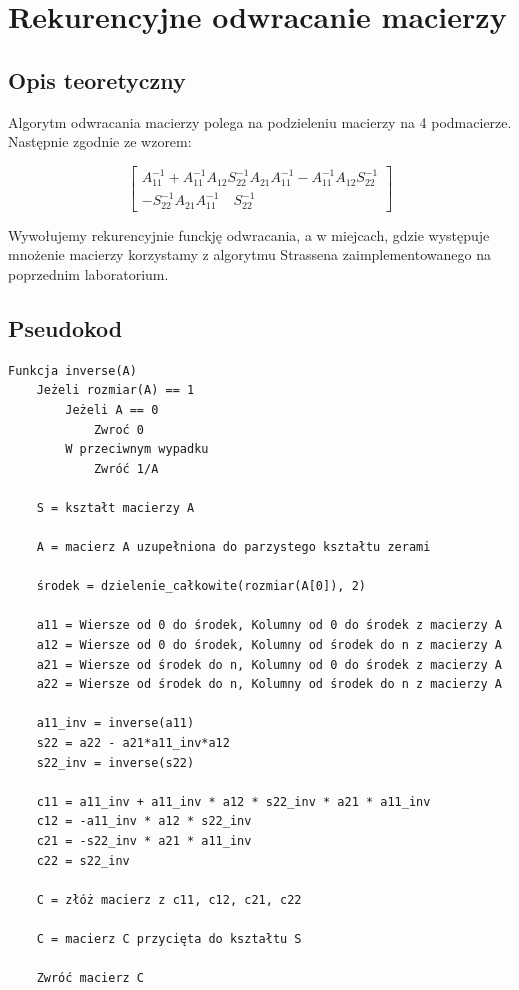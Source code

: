 \documentclass{article}
\begin{document}
\section{Rekurencyjne odwracanie macierzy}

\subsection{Opis teoretyczny}

Algorytm odwracania macierzy polega na podzieleniu macierzy na 4 podmacierze. Następnie zgodnie ze wzorem:

\[
\begin{bmatrix}
A_{11}^{-1} + A_{11}^{-1} A_{12} S_{22}^{-1} A_{21} A_{11}^{-1} - A_{11}^{-1} A_{12} S_{22}^{-1} \\
- S_{22}^{-1} A_{21} A_{11}^{-1} \quad S_{22}^{-1}
\end{bmatrix}
\]


\bigbreak

\noindent
Wywołujemy rekurencyjnie funckję odwracania, a w miejcach, gdzie występuje mnożenie macierzy korzystamy z algorytmu Strassena zaimplementowanego na poprzednim laboratorium.

\subsection{Pseudokod}

\begin{verbatim}
Funkcja inverse(A)
    Jeżeli rozmiar(A) == 1
        Jeżeli A == 0
            Zwroć 0
        W przeciwnym wypadku
            Zwróć 1/A

    S = kształt macierzy A

    A = macierz A uzupełniona do parzystego kształtu zerami

    środek = dzielenie_całkowite(rozmiar(A[0]), 2) 
    
    a11 = Wiersze od 0 do środek, Kolumny od 0 do środek z macierzy A
    a12 = Wiersze od 0 do środek, Kolumny od środek do n z macierzy A
    a21 = Wiersze od środek do n, Kolumny od 0 do środek z macierzy A
    a22 = Wiersze od środek do n, Kolumny od środek do n z macierzy A
    
    a11_inv = inverse(a11)
    s22 = a22 - a21*a11_inv*a12
    s22_inv = inverse(s22)

    c11 = a11_inv + a11_inv * a12 * s22_inv * a21 * a11_inv
    c12 = -a11_inv * a12 * s22_inv
    c21 = -s22_inv * a21 * a11_inv
    c22 = s22_inv

    C = złóż macierz z c11, c12, c21, c22

    C = macierz C przycięta do kształtu S

    Zwróć macierz C
\end{verbatim}
\end{document}
